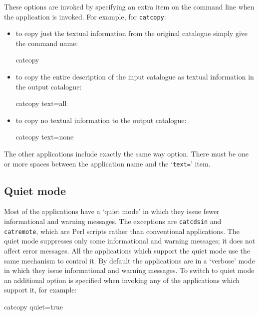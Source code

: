 \documentclass[twoside,11pt]{starlink}
\begin{document}
These options are invoked by specifying an extra item on the command
line when the application is invoked.  For example, for \texttt{catcopy}:

\begin{itemize}

  \item to copy just the textual information from the original
   catalogue simply give the command name:

  \begin{terminalv}
catcopy
  \end{terminalv}

  \item to copy the entire description of the input catalogue as
   textual information in the output catalogue:

  \begin{terminalv}
catcopy text=all
  \end{terminalv}

  \item to copy no textual information to the output catalogue:

  \begin{terminalv}
catcopy  text=none
  \end{terminalv}

\end{itemize}

The other applications include exactly the same way option.  There must be
one or more spaces between the application name and the `\texttt{text=}' item.

\subsection{\label{QUIET}Quiet mode}

Most of the applications have a `quiet mode' in which they issue fewer
informational and warning messages.  The exceptions are \texttt{catcdsin}
and \texttt{catremote}, which are Perl scripts rather than conventional
applications.  The quiet mode suppresses only some informational and
warning messages; it does not affect error messages.  All the applications
which support the quiet mode use the same mechanism to control it.
By default the applications are in a `verbose' mode in which they
issue informational and warning messages.  To switch to quiet mode an
additional option is specified when invoking any of the applications which
support it, for example:

\begin{terminalv}
catcopy  quiet=true
\end{terminalv}
\end{document}
